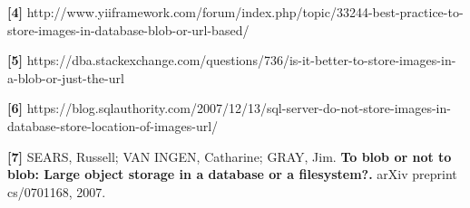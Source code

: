 \documentclass[12pt,a4paper]{article}
\begin{document}
\noindent \textbf{[4]} {http://www.yiiframework.com/forum/index.php/topic/33244-best-practice-to-store-images-in-database-blob-or-url-based/}\\\vspace{0.2cm}

\noindent \textbf{[5]} {https://dba.stackexchange.com/questions/736/is-it-better-to-store-images-in-a-blob-or-just-the-url}\\\vspace{0.2cm}

\noindent \textbf{[6]} {https://blog.sqlauthority.com/2007/12/13/sql-server-do-not-store-images-in-database-store-location-of-images-url/}\\\vspace{0.2cm}

\noindent \textbf{[7]} SEARS, Russell; VAN INGEN, Catharine; GRAY, Jim. \textbf{To blob or not to blob: Large object storage in a database or a filesystem?.} arXiv preprint cs/0701168, 2007.
\end{document}

